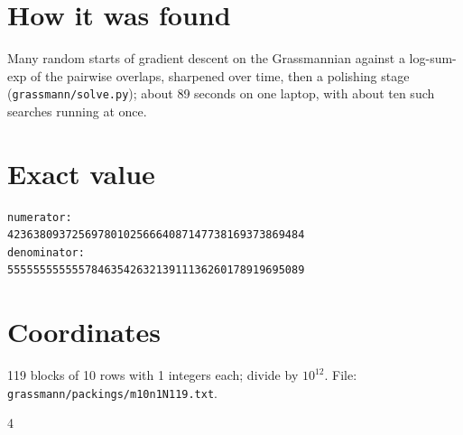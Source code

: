 \documentclass[11pt,a4paper]{article}
\begin{document}
\section{How it was found}
Many random starts of gradient descent on the Grassmannian against a log-sum-exp of the pairwise overlaps, sharpened over time, then a polishing stage (\texttt{grassmann/solve.py}); about 89 seconds on one laptop, with about ten such searches running at once.


\appendix
\section{Exact value}
{\small
\begin{verbatim}
numerator:
4236380937256978010256664087147738169373869484
denominator:
5555555555557846354263213911136260178919695089
\end{verbatim}}

\section{Coordinates}
119 blocks of 10 rows with 1 integers each; divide by $10^{12}$. File: \texttt{grassmann/packings/m10n1N119.txt}.
{\tiny
\begin{multicols}{4}
\end{multicols}}
\end{document}
